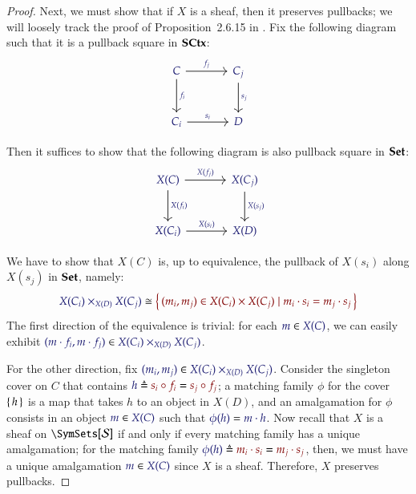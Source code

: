 \documentclass[11pt]{article}
\theoremstyle{definition}
\theoremstyle{remark}
\numberwithin{equation}{section}
\newcommand\SCtxSite{\SymSets[\Sorts]}
\begin{document}
\begin{proof}
  Next, we must show that if $X$ is a sheaf, then it preserves pullbacks; we
  will loosely track the proof of Proposition~2.6.15 in \cite{biering:2004}.
  Fix the following diagram such that it is a pullback square in $\mathbf{SCtx}$:
  \[
    \begin{tikzcd}[sep=large]
      \IMode{C}
        \arrow[r, "\IMode{f_j}"]
        \arrow[d, "\IMode{f_i}"] &
      \IMode{C_j} \arrow[d, "\IMode{s_j}"]\\
      \IMode{C_i} \arrow[r, "\IMode{s_i}"] &
      \IMode{D}
    \end{tikzcd}
  \]

  Then it suffices to show that the following diagram is also pullback square
  in $\mathbf{Set}$:
  \[
    \begin{tikzcd}[sep=large]
      \IMode{X(C)}
        \arrow[r, "\IMode{X(f_j)}"]
        \arrow[d, "\IMode{X(f_i)}"] &
      \IMode{X(C_j)} \arrow[d, "\IMode{X(s_j)}"]\\
      \IMode{X(C_i)} \arrow[r, "\IMode{X(s_i)}"] &
      \IMode{X(D)}
    \end{tikzcd}
  \]

  We have to show that $X(C)$ is, up to equivalence, the pullback of $X(s_i)$
  along $X(s_j)$ in $\mathbf{Set}$, namely:
  \[
    \IMode{X(C_i)\times_{X(D)}X(C_j)}
      \cong
    \OMode{
      \MkSet{
        (m_i, m_j)\in X(C_i)\times X(C_j)
          \mid
        m_i \cdot s_i = m_j \cdot s_j
      }
    }
  \]
  The first direction of the equivalence is trivial: for each
  $\Member{m}{X(C)}$, we can easily exhibit $\Member{(m\cdot f_i,m\cdot
  f_j)}{X(C_i)\times_{X(D)}X(C_j)}$.

  For the other direction, fix $\Member{(m_i,
  m_j)}{X(C_i)\times_{X(D)}X(C_j)}$.  Consider the singleton cover on $C$ that
  contains $\Define{h}{s_i\circ f_i}=\OMode{s_j\circ f_j}$; a matching family
  $\phi$ for the cover $\left\{\,h\,\right\}$ is a map that takes $h$ to an object in
  $X(D)$, and an amalgamation for $\phi$ consists in an object
  $\Member{m}{X(C)}$ such that $\IsEq{\phi(h)}{m\cdot h}$. Now recall that $X$
  is a sheaf on $\SCtxSite$ if and only if every matching family has a unique
  amalgamation; for the matching family $\Define{\phi(h)}{m_i\cdot
  s_i}=\OMode{m_j\cdot s_j}$, then, we must have a unique amalgamation
  $\Member{m}{X(C)}$ since $X$ is a sheaf. Therefore, $X$ preserves pullbacks.

\end{proof}


\ifdraft{}{
  \newpage
  
  
}
\end{document}
